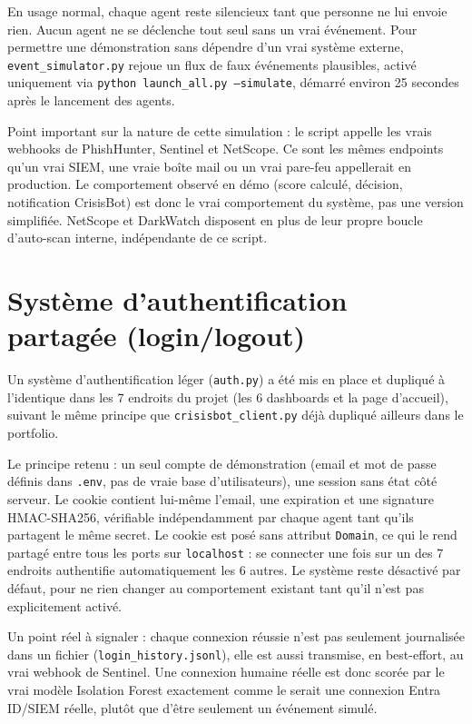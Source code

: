 \documentclass[12pt,a4paper]{report}
\begin{document}
En usage normal, chaque agent reste silencieux tant que personne ne lui envoie rien. Aucun agent ne se déclenche tout seul sans un vrai événement. Pour permettre une démonstration sans dépendre d'un vrai système externe, \texttt{event\_simulator.py} rejoue un flux de faux événements plausibles, activé uniquement via \texttt{python launch\_all.py --simulate}, démarré environ 25 secondes après le lancement des agents.

Point important sur la nature de cette simulation : le script appelle les vrais webhooks de PhishHunter, Sentinel et NetScope. Ce sont les mêmes endpoints qu'un vrai SIEM, une vraie boîte mail ou un vrai pare-feu appellerait en production. Le comportement observé en démo (score calculé, décision, notification CrisisBot) est donc le vrai comportement du système, pas une version simplifiée. NetScope et DarkWatch disposent en plus de leur propre boucle d'auto-scan interne, indépendante de ce script.

\section{Système d'authentification partagée (login/logout)}

Un système d'authentification léger (\texttt{auth.py}) a été mis en place et dupliqué à l'identique dans les 7 endroits du projet (les 6 dashboards et la page d'accueil), suivant le même principe que \texttt{crisisbot\_client.py} déjà dupliqué ailleurs dans le portfolio.

Le principe retenu : un seul compte de démonstration (email et mot de passe définis dans \texttt{.env}, pas de vraie base d'utilisateurs), une session sans état côté serveur. Le cookie contient lui-même l'email, une expiration et une signature HMAC-SHA256, vérifiable indépendamment par chaque agent tant qu'ils partagent le même secret. Le cookie est posé sans attribut \texttt{Domain}, ce qui le rend partagé entre tous les ports sur \texttt{localhost} : se connecter une fois sur un des 7 endroits authentifie automatiquement les 6 autres. Le système reste désactivé par défaut, pour ne rien changer au comportement existant tant qu'il n'est pas explicitement activé.

Un point réel à signaler : chaque connexion réussie n'est pas seulement journalisée dans un fichier (\texttt{login\_history.jsonl}), elle est aussi transmise, en best-effort, au vrai webhook de Sentinel. Une connexion humaine réelle est donc scorée par le vrai modèle Isolation Forest exactement comme le serait une connexion Entra ID/SIEM réelle, plutôt que d'être seulement un événement simulé.
\end{document}
